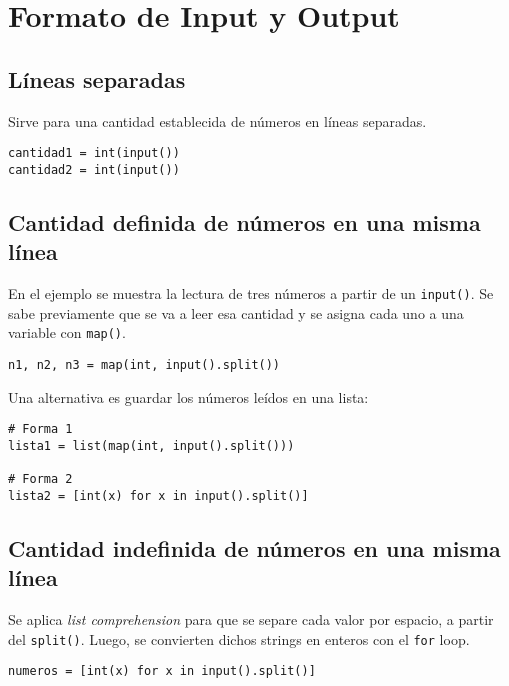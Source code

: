 \documentclass[12pt,letterpaper]{article}
\begin{document}


\tableofcontents

\newpage

\section{Formato de Input y Output}

\subsection{Líneas separadas}

Sirve para una cantidad establecida de números en líneas separadas.

\begin{verbatim}
cantidad1 = int(input())
cantidad2 = int(input())
\end{verbatim}

\subsection{Cantidad definida de números en una misma línea}

En el ejemplo se muestra la lectura de tres números a partir de un \texttt{input()}.
Se sabe previamente que se va a leer esa cantidad y se asigna cada uno a una variable con \texttt{map()}.

\begin{verbatim}
n1, n2, n3 = map(int, input().split())
\end{verbatim}

Una alternativa es guardar los números leídos en una lista:

\begin{verbatim}
# Forma 1
lista1 = list(map(int, input().split()))

# Forma 2
lista2 = [int(x) for x in input().split()]
\end{verbatim}

\subsection{Cantidad indefinida de números en una misma línea}

Se aplica \textit{list comprehension} para que se separe cada valor por espacio, a partir del \texttt{split()}. Luego, se convierten dichos strings en enteros con el \texttt{for} loop.

\begin{verbatim}
numeros = [int(x) for x in input().split()]
\end{verbatim}
\end{document}
